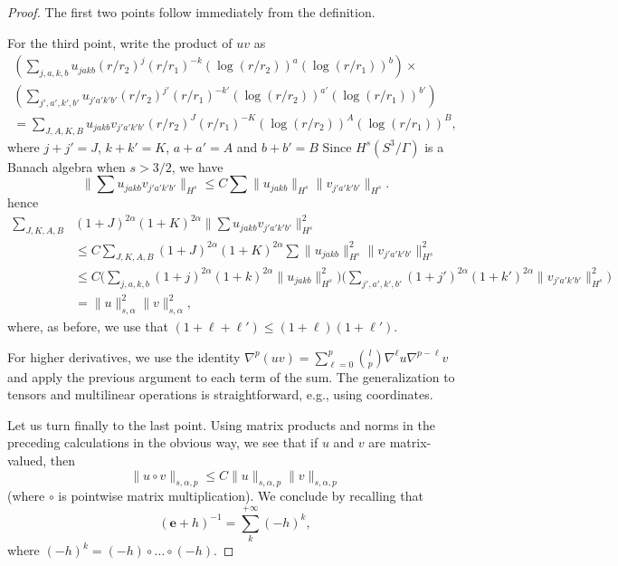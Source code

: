\documentclass[12pt]{article}
\begin{document}
\begin{proof}
The first two points follow immediately from the definition.
        
For the third point, write the product of $uv$ as
\begin{multline*}
\left( \sum_{j,a,k, b} u_{j a k b} (r/r_2)^j (r/r_1)^{-k} (\log (r/r_2))^a( \log (r/r_1))^b\right)
\times  \\
\left( \sum_{j',a',k',b'} u_{j'a'k' b'} (r/r_2)^{j'}(r/r_1)^{-k'} (\log (r/r_2))^{a'}( \log (r/r_1))^{b'}\right)\\
= \sum_{J,A,K,B} u_{j a k b} v_{j' a' k' b'} (r/r_2)^{J}(r/r_1)^{-K} (\log (r/r_2))^{A}( \log (r/r_1))^{B},
\end{multline*}
where $j + j' = J$, $k + k' = K$, $a + a' = A$ and $b+b' = B$
Since $ H^s(S^3/\Gamma) $ is a Banach algebra when $s>3/2$, we have
\[
\big\|\sum u_{ja k b}v_{j' a' k' b'}\big\|_{H^s} \leqslant C \sum \| u_{j a k b}\|_{H^s}\|v_{j' a' k' b'}\|_{H^s}.
\]
hence
\begin{align*}
\sum_{J,K,A,B}&(1+J)^{2\alpha}(1+K)^{2\alpha}\big\|\sum u_{j a k b}v_{j' a' k' b'}\big\|^2_{H^s}\\
&\leqslant C   \sum_{J,K,A,B}(1+J)^{2\alpha}(1+K)^{2\alpha} \sum \| u_{j a k b} \|^2_{H^s}\|v_{j' a' k' b'}\|^2_{H^s}\\
& \leqslant C  \Big( \sum_{j,a,k,b} (1+j)^{2\alpha} (1+k)^{2\alpha}\|u_{j ak b}\|^2_{H^s}\Big)
\Big(\sum_{j',a',k',b'}(1+j')^{2\alpha}(1+k')^{2\alpha}\|v_{j' a' k' b'}\|^2_{H^s} \Big)\\
&= \|u\|^2_{s,\alpha} \|v\|^2_{s,\alpha},
\end{align*}
where, as before, we use that $(1 + \ell + \ell') \leq (1+\ell)(1 + \ell')$. 
  
For higher derivatives, we use the identity
$ \nabla^p (uv) = \sum_{\ell= 0}^p {l\choose{p}} \nabla^\ell u\nabla^{p-\ell}v$ and apply the previous argument to each term of the sum. The generalization to tensors and multilinear operations is straightforward, e.g., using coordinates. 
        
Let us turn finally to the last point.  Using matrix products and norms in the preceding calculations in the obvious way, we see
that if $u$ and $v$ are matrix-valued, then 
\[
\|u\circ v\|_{s,\alpha,p}\leqslant C \|u\|_{s,\alpha,p} \|v\|_{s,\alpha,p}
\]
(where $\circ$ is pointwise matrix multiplication).  We conclude by recalling that
\[
(\mathbf{e}+h)^{-1} = \sum_{k}^{+\infty}(-h)^k,
\]
where $(-h)^k = (-h)\circ\ldots\circ(-h)$.
\end{proof}
    
\end{document}
